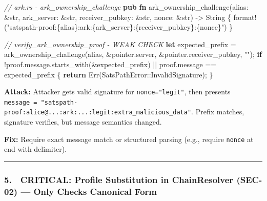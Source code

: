 \documentclass[
]{article}
\newenvironment{Shaded}{}{}
\newcommand{\CommentTok}[1]{\textcolor[rgb]{0.38,0.63,0.69}{\textit{#1}}}
\newcommand{\ConstantTok}[1]{\textcolor[rgb]{0.53,0.00,0.00}{#1}}
\newcommand{\ControlFlowTok}[1]{\textcolor[rgb]{0.00,0.44,0.13}{\textbf{#1}}}
\newcommand{\DataTypeTok}[1]{\textcolor[rgb]{0.56,0.13,0.00}{#1}}
\newcommand{\KeywordTok}[1]{\textcolor[rgb]{0.00,0.44,0.13}{\textbf{#1}}}
\newcommand{\NormalTok}[1]{#1}
\newcommand{\OperatorTok}[1]{\textcolor[rgb]{0.40,0.40,0.40}{#1}}
\newcommand{\PreprocessorTok}[1]{\textcolor[rgb]{0.74,0.48,0.00}{#1}}
\newcommand{\StringTok}[1]{\textcolor[rgb]{0.25,0.44,0.63}{#1}}
\begin{document}
\begin{Shaded}
\begin{Highlighting}[]
\CommentTok{// ark.rs {-} ark\_ownership\_challenge}
\KeywordTok{pub} \KeywordTok{fn}\NormalTok{ ark\_ownership\_challenge(alias}\OperatorTok{:} \OperatorTok{\&}\DataTypeTok{str}\OperatorTok{,}\NormalTok{ ark\_server}\OperatorTok{:} \OperatorTok{\&}\DataTypeTok{str}\OperatorTok{,}\NormalTok{ receiver\_pubkey}\OperatorTok{:} \OperatorTok{\&}\DataTypeTok{str}\OperatorTok{,}\NormalTok{ nonce}\OperatorTok{:} \OperatorTok{\&}\DataTypeTok{str}\NormalTok{) }\OperatorTok{{-}\textgreater{}} \DataTypeTok{String} \OperatorTok{\{}
    \PreprocessorTok{format!}\NormalTok{(}\StringTok{"satspath{-}proof:\{alias\}:ark:\{ark\_server\}:\{receiver\_pubkey\}:\{nonce\}"}\NormalTok{)}
\OperatorTok{\}}

\CommentTok{// verify\_ark\_ownership\_proof {-} WEAK CHECK}
\KeywordTok{let}\NormalTok{ expected\_prefix }\OperatorTok{=}\NormalTok{ ark\_ownership\_challenge(alias}\OperatorTok{,} \OperatorTok{\&}\NormalTok{pointer}\OperatorTok{.}\NormalTok{server}\OperatorTok{,} \OperatorTok{\&}\NormalTok{pointer}\OperatorTok{.}\NormalTok{receiver\_pubkey}\OperatorTok{,} \StringTok{""}\NormalTok{)}\OperatorTok{;}
\ControlFlowTok{if} \OperatorTok{!}\NormalTok{proof}\OperatorTok{.}\NormalTok{message}\OperatorTok{.}\NormalTok{starts\_with(}\OperatorTok{\&}\NormalTok{expected\_prefix) }\OperatorTok{||}\NormalTok{ proof}\OperatorTok{.}\NormalTok{message }\OperatorTok{==}\NormalTok{ expected\_prefix }\OperatorTok{\{}
    \ControlFlowTok{return} \ConstantTok{Err}\NormalTok{(}\PreprocessorTok{SatsPathError::}\NormalTok{InvalidSignature)}\OperatorTok{;}
\OperatorTok{\}}
\end{Highlighting}
\end{Shaded}

\textbf{Attack:} Attacker gets valid signature for
\texttt{nonce="legit"}, then presents
\texttt{message\ =\ "satspath-proof:alice@...:ark:...:legit:extra\_malicious\_data"}.
Prefix matches, signature verifies, but message semantics changed.

\textbf{Fix:} Require exact message match or structured parsing (e.g.,
require \texttt{nonce} at end with delimiter).

\begin{center}\rule{0.5\linewidth}{0.5pt}\end{center}

\hypertarget{critical-profile-substitution-in-chainresolver-sec-02-only-checks-canonical-form}{%
\subsubsection{5. 🔴 CRITICAL: Profile Substitution in ChainResolver
(SEC-02) --- Only Checks Canonical
Form}\label{critical-profile-substitution-in-chainresolver-sec-02-only-checks-canonical-form}}
\end{document}
